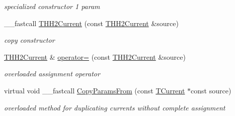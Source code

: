 \begin{DoxyCompactItemize}
\begin{DoxyCompactList}\small\item\em specialized constructor 1 param \end{DoxyCompactList}\item 
\hypertarget{class_t_h_h2_current_ae4e64c99cbf1340cdc8262c4bccfcbe4}{\+\_\+\+\_\+fastcall \hyperlink{class_t_h_h2_current_ae4e64c99cbf1340cdc8262c4bccfcbe4}{T\+H\+H2\+Current} (const \hyperlink{class_t_h_h2_current}{T\+H\+H2\+Current} \&source)}\label{class_t_h_h2_current_ae4e64c99cbf1340cdc8262c4bccfcbe4}

\begin{DoxyCompactList}\small\item\em copy constructor \end{DoxyCompactList}\item 
\hypertarget{class_t_h_h2_current_a61f3fd3e6cf27271edb52a1aed19be3d}{\hyperlink{class_t_h_h2_current}{T\+H\+H2\+Current} \& \hyperlink{class_t_h_h2_current_a61f3fd3e6cf27271edb52a1aed19be3d}{operator=} (const \hyperlink{class_t_h_h2_current}{T\+H\+H2\+Current} \&source)}\label{class_t_h_h2_current_a61f3fd3e6cf27271edb52a1aed19be3d}

\begin{DoxyCompactList}\small\item\em overloaded assignment operator \end{DoxyCompactList}\item 
\hypertarget{class_t_h_h2_current_a54794ac19d18ec1f9cba53210bca4cf5}{virtual void \+\_\+\+\_\+fastcall \hyperlink{class_t_h_h2_current_a54794ac19d18ec1f9cba53210bca4cf5}{Copy\+Params\+From} (const \hyperlink{class_t_current}{T\+Current} $\ast$const source)}\label{class_t_h_h2_current_a54794ac19d18ec1f9cba53210bca4cf5}

\begin{DoxyCompactList}\small\item\em overloaded method for duplicating currents without complete assignment \end{DoxyCompactList}\end{DoxyCompactItemize}
